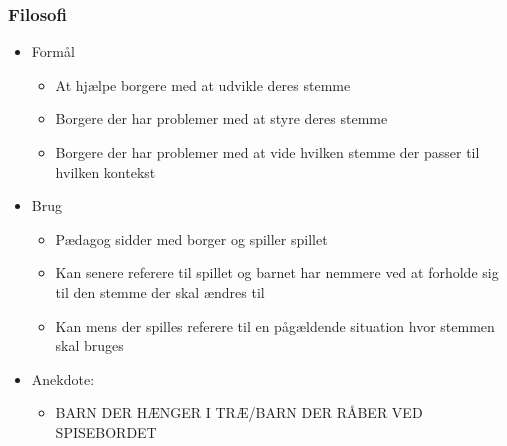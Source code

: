 \begin{frame}
\frametitle{Filosofi}

\begin{itemize}
\item Formål
\begin{itemize}
\item At hjælpe borgere med at udvikle deres stemme
\item Borgere der har problemer med at styre deres stemme
\item Borgere der har problemer med at vide hvilken stemme der passer til hvilken kontekst
\end{itemize}
\item Brug
\begin{itemize}
\item Pædagog sidder med borger og spiller spillet
\item Kan senere referere til spillet og barnet har nemmere ved at forholde sig til den stemme der skal ændres til
\item Kan mens der spilles referere til en pågældende situation hvor stemmen skal bruges
\end{itemize}
\item Anekdote:
\begin{itemize}
\item BARN DER HÆNGER I TRÆ/BARN DER RÅBER VED SPISEBORDET
\end{itemize}
\end{itemize}

\end{frame}


